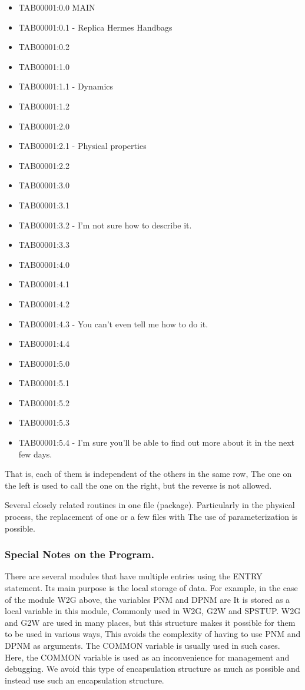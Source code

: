 \begin{itemize}
\item
  TAB00001:0.0 MAIN
\item
  TAB00001:0.1 - Replica Hermes Handbags
\item
  TAB00001:0.2
\item
  TAB00001:1.0
\item
  TAB00001:1.1 - Dynamics
\item
  TAB00001:1.2
\item
  TAB00001:2.0
\item
  TAB00001:2.1 - Physical properties
\item
  TAB00001:2.2
\item
  TAB00001:3.0
\item
  TAB00001:3.1
\item
  TAB00001:3.2 - I'm not sure how to describe it.
\item
  TAB00001:3.3
\item
  TAB00001:4.0
\item
  TAB00001:4.1
\item
  TAB00001:4.2
\item
  TAB00001:4.3 - You can't even tell me how to do it.
\item
  TAB00001:4.4
\item
  TAB00001:5.0
\item
  TAB00001:5.1
\item
  TAB00001:5.2
\item
  TAB00001:5.3
\item
  TAB00001:5.4 - I'm sure you'll be able to find out more about it in
  the next few days.
\end{itemize}

That is, each of them is independent of the others in the same row, The
one on the left is used to call the one on the right, but the reverse is
not allowed.

Several closely related routines in one file (package). Particularly in
the physical process, the replacement of one or a few files with The use
of parameterization is possible.

\hypertarget{special-notes-on-the-program.}{%
\subsubsection{Special Notes on the
Program.}\label{special-notes-on-the-program.}}

There are several modules that have multiple entries using the ENTRY
statement. Its main purpose is the local storage of data. For example,
in the case of the module W2G above, the variables PNM and DPNM are It
is stored as a local variable in this module, Commonly used in W2G, G2W
and SPSTUP. W2G and G2W are used in many places, but this structure
makes it possible for them to be used in various ways, This avoids the
complexity of having to use PNM and DPNM as arguments. The COMMON
variable is usually used in such cases. Here, the COMMON variable is
used as an inconvenience for management and debugging. We avoid this
type of encapsulation structure as much as possible and instead use such
an encapsulation structure.

